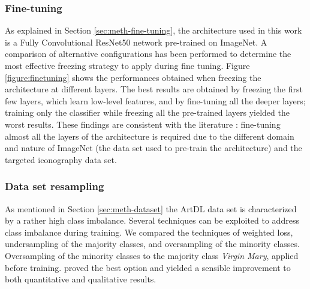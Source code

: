 \documentclass[acmlarge]{acmart}
\begin{document}
\subsubsection{Fine-tuning} 
As explained in Section \ref{sec:meth-fine-tuning}, the architecture used in this work is a Fully Convolutional ResNet50 network pre-trained on ImageNet. A comparison of alternative configurations has been performed to determine the most effective freezing strategy to apply during fine tuning. Figure \ref{figure:finetuning} shows the performances obtained when freezing the architecture at different layers. The best results are obtained by freezing the first few layers, which learn low-level features, and by fine-tuning all the deeper layers;  training  only the classifier while freezing all the pre-trained layers yielded the worst results. These findings are consistent with the literature \cite{yosinski2014transferable}: fine-tuning almost all the layers of the architecture is required due to the different domain and nature of ImageNet (the data set used to pre-train the architecture) and the targeted iconography data set.

\subsubsection{Data set resampling}
As mentioned in  Section \ref{sec:meth-dataset} the ArtDL data set is characterized by a rather high class imbalance. Several techniques can be exploited to address class imbalance during training. We compared  the techniques of weighted loss,  undersampling of the majority classes, and oversampling of the minority classes. Oversampling of the minority classes to the majority class \textit{Virgin Mary}, applied before training. proved the best option and yielded a sensible improvement to both quantitative and qualitative results.
\end{document}
